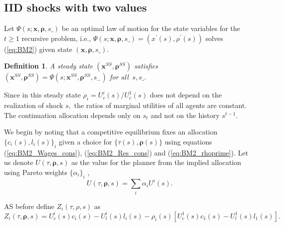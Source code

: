 \documentclass[thmsb,11pt]{article}
\newtheorem{definition}{Definition}
\begin{document}
\subsection{IID shocks with two values}
Let $\Psi \left( s;\bm{x},\bm{\rho },s\_\right) $ be an optimal  law of motion for the state variables
for the $t\geq1$ recursive problem, i.e., $\Psi \left( s;\bm{x},%
\bm{\rho },s\_\right) =\left( x^{\prime }\left( s\right) ,\rho ^{\prime
}\left( s\right) \right) $  solves (\ref{eq:BM2}) given state $\left(
\bm{x},\bm{\rho },s\_\right) .$
\begin{definition}
 A steady state  $\left( \bm{x}^{SS},\bm{\rho} ^{SS}\right) $  satisfies $\left(\bm{ x}^{SS},\bm{\rho}
^{SS}\right) =\Psi \left( s;\bm{x}^{SS},\bm{\rho} ^{SS},s_{-}\right) $ for all $%
\,s,s\_.$
\end{definition}
Since in this steady state $\rho_i =U_{c}^{i}(s)/U_{c}^{1}(s)$ does
not depend on the realization of shock $s,$ the ratios of marginal utilities
of  all agents are constant. The continuation allocation depends only on  $s_{t}$ and not on the  history $s^{t-1}$.%

We  begin by noting that a competitive equilibrium fixes an allocation $\{c_i(s),l_i(s)\}_{i}$ given a choice for $\{\tau(s), \bm{\rho}(s)\}$ using equations (\ref{eq:BM2_Wages_cons}), (\ref{eq:BM2_Res_cons}) and (\ref{eq:BM2_rhoprime}).  Let us denote $U(\tau,\bm{\rho},s)$ as the value for the planner from the implied allocation using Pareto weights $\{\alpha_i\}_i$ ,
\[U(\tau,\bm{\rho},s)=\sum_{i}\alpha_i U^i(s).\]

AS before define $Z_i(\tau,\rho,s)$ as
\[Z_i(\tau,\bm \rho,s)=U^i_c(s)c_i(s)-U^i_l(s)l_i(s)-\rho_i(s)\left[U^1_c(s)c_1(s)-U^1_l(s)l_1(s)\right].\]
\end{document}
